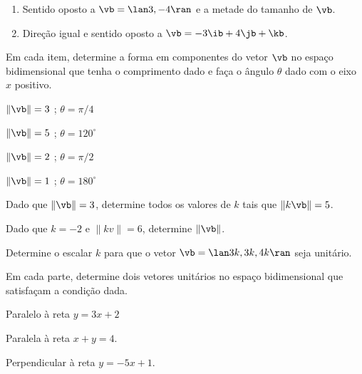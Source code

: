 \item 
    \begin{enumerate}[leftmargin=*]
        \item Sentido oposto a $\vb=\lan 3,-4\ran$ e a metade do tamanho de $\vb$.
        \item Direção igual e sentido oposto a $\vb=-3\ib +4\jb +\kb$.%
    \end{enumerate}
    
 \item Em cada item, determine a forma em componentes do vetor $\vb$ no espaço bidimensional que tenha o comprimento dado e faça o ângulo $\theta$ dado com o eixo $x$ positivo.

    \begin{enumerate}[leftmargin=*]
        \begin{multicols}{2}
        \item $\|\vb\|=3$ ; $\theta=\pi/4$
        \item $\|\vb\|=5$ ; $\theta=120^{\circ}$
        \item $\|\vb\|=2$ ; $\theta=\pi/2$
        \item $\|\vb\|=1$ ; $\theta=180^{\circ}$
        \end{multicols}
    \end{enumerate}
 
      \item Dado que $\|\vb\|=3$, determine todos os valores de $k$ tais que $\|k\vb\|=5$.
      \item Dado que $k =-2$ e $\|kv\|=6$, determine $\| \vb\|$.
      \item Determine o escalar $k$ para que o vetor $\vb=\lan 3k,3k,4k\ran$ seja unitário.
  
\item Em cada parte, determine dois vetores unitários no espaço bidimensional que satisfaçam a condição dada.

    \begin{enumerate}[leftmargin=*]
        \begin{multicols}{2}
        \item Paralelo à reta $y = 3x + 2$
        \item Paralela à reta $x + y = 4$.
        \item Perpendicular à reta $y = -5x +1$.
        \end{multicols}
    \end{enumerate}

